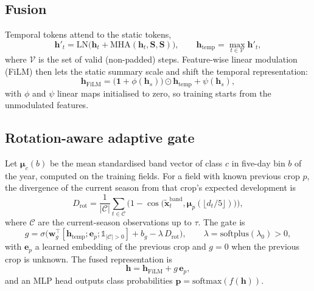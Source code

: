 \subsection{Fusion}
Temporal tokens attend to the static tokens,
\begin{equation}
  \mathbf{h}'_t = \mathrm{LN}\big(\mathbf{h}_t + \mathrm{MHA}(\mathbf{h}_t, \mathbf{S}, \mathbf{S})\big),
  \qquad
  \mathbf{h}_{\text{temp}} = \max_{t \in \mathcal{V}} \mathbf{h}'_t ,
\end{equation}
where $\mathcal{V}$ is the set of valid (non-padded) steps. Feature-wise linear modulation (FiLM) then lets
the static summary scale and shift the temporal representation:
\begin{equation}
  \mathbf{h}_{\text{FiLM}} = \big(\mathbf{1} + \phi(\mathbf{h}_s)\big) \odot \mathbf{h}_{\text{temp}} + \psi(\mathbf{h}_s),
\end{equation}
with $\phi$ and $\psi$ linear maps initialised to zero, so training starts from the unmodulated features.

\subsection{Rotation-aware adaptive gate}
Let $\boldsymbol{\mu}_c(b)$ be the mean standardised band vector of class $c$ in five-day bin $b$ of the
year, computed on the training fields. For a field with known previous crop $p$, the divergence of the
current season from that crop's expected development is
\begin{equation}
  D_{\text{rot}} = \frac{1}{|\mathcal{C}|} \sum_{t \in \mathcal{C}}
  \Big(1 - \cos\big(\tilde{\mathbf{x}}^{\text{band}}_t, \boldsymbol{\mu}_p(\lfloor d_t / 5 \rfloor)\big)\Big),
\end{equation}
where $\mathcal{C}$ are the current-season observations up to $\tau$. The gate is
\begin{equation}
  g = \sigma\big(\mathbf{w}_g^{\top}[\mathbf{h}_{\text{temp}} ; \mathbf{e}_p ; \mathbb{1}_{|\mathcal{C}|>0}] + b_g
      - \lambda\, D_{\text{rot}}\big), \qquad \lambda = \mathrm{softplus}(\lambda_0) > 0,
\end{equation}
with $\mathbf{e}_p$ a learned embedding of the previous crop and $g = 0$ when the previous crop is unknown.
The fused representation is
\begin{equation}
  \mathbf{h} = \mathbf{h}_{\text{FiLM}} + g\, \mathbf{e}_p ,
\end{equation}
and an MLP head outputs class probabilities $\mathbf{p} = \mathrm{softmax}(f(\mathbf{h}))$.

